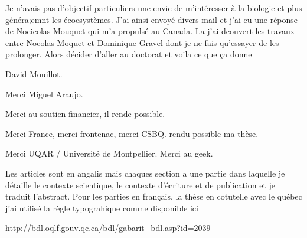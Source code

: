 
\avantpropos
{}
%

Je n'avais pas d'objectif particuliers une envie de m'intéresser à la biologie et plus généra;emnt les écocsystèmes. J'ai ainsi envoyé divers mail et j'ai eu une réponse de Nocicolas Mouquet qui m'a propulsé au Canada. La j'ai dcouvert les travaux entre Nocolas Moquet et Dominique Gravel dont je ne fais qu'essayer de les prolonger. Alors décider d'aller au doctorat et voila ce que ça donne

David Mouillot.

Merci Miguel Araujo.

Merci au soutien financier, il rende possible.

Merci France, merci frontenac, merci CSBQ. rendu possible ma thèse.

Merci UQAR / Université de Montpellier.
Merci au geek.


Les articles sont en angalis mais chaques section a une partie  dans laquelle je détaille le contexte scientique, le contexte d'écriture et de publication et je traduit l'abstract.
Pour les parties en français, la thèse en cotutelle avec le québec j'ai utilisé la règle typograhique comme disponible ici

\url{http://bdl.oqlf.gouv.qc.ca/bdl/gabarit_bdl.asp?id=2039}


